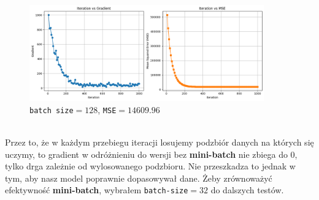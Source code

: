 \documentclass[polish,12pt,a4paper]{extarticle}
\begin{document}
\begin{figure}
\begin{minipage}[b]{0.48\textwidth}
    \includegraphics[width=0.9\textwidth]{data/b128.png}
    \caption{\texttt{batch size}$=128$, \texttt{MSE}$=14609.96$}
    \end{minipage}
\end{figure} \bigskip \\
Przez to, że w każdym przebiegu iteracji losujemy podzbiór danych na których się uczymy, to gradient w odróżnieniu do wersji bez \textbf{mini-batch} nie zbiega do 0, tylko drga zależnie od wylosowanego podzbioru. Nie przeszkadza to jednak w tym, aby nasz model poprawnie dopasowywał dane. Żeby zrównoważyć efektywność \textbf{mini-batch}, wybrałem \texttt{batch-size}$= 32$ do dalszych testów.

\FloatBarrier
\end{document}
